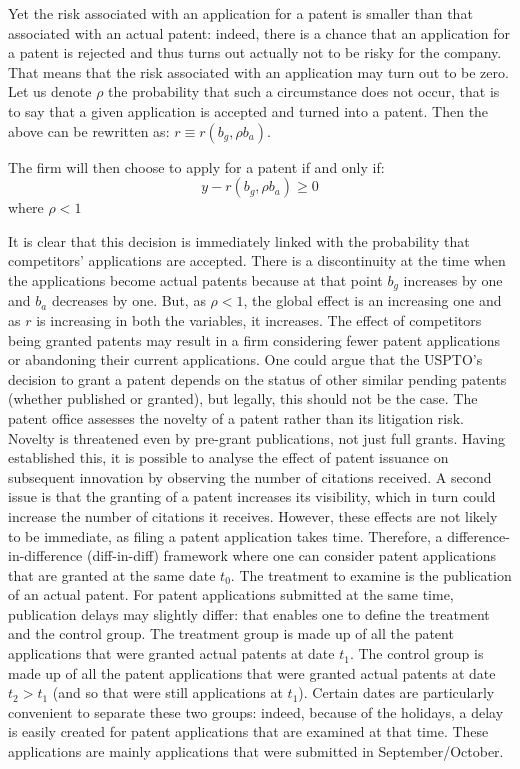 \documentclass[12pt]{article}
\begin{document}
Yet the risk associated with an application for a patent is smaller than that associated with an actual patent: indeed, there is a chance that an application for a patent is rejected and thus turns out actually not to be risky for the company. That means that the risk associated with an application may turn out to be zero. Let us denote $\rho$ the probability that such a circumstance does not occur, that is to say that a given application is accepted and turned into a patent. Then the above can be rewritten as: $r \equiv r(b_g,\rho b_a)$.

The firm will then choose to apply for a patent if and only if: 
\[
y - r(b_g,\rho b_a) \geq 0
\]
where $\rho < 1$

It is clear that this decision is immediately linked with the probability that competitors' applications are accepted. There is a discontinuity at the time when the applications become actual patents because at that point $b_g$ increases by one and $b_a$ decreases by one. But, as $\rho < 1$, the global effect is an increasing one and as $r$ is increasing in both the variables, it increases. 
The effect of competitors being granted patents may result in a firm considering fewer patent applications or abandoning their current applications. One could argue that the USPTO's decision to grant a patent depends on the status of other similar pending patents (whether published or granted), but legally, this should not be the case. The patent office assesses the novelty of a patent rather than its litigation risk. Novelty is threatened even by pre-grant publications, not just full grants.
Having established this, it is possible to analyse the effect of patent issuance on subsequent innovation by observing the number of citations received.
A second issue is that the granting of a patent increases its visibility, which in turn could increase the number of citations it receives. However, these effects are not likely to be immediate, as filing a patent application takes time.
Therefore, a difference-in-difference (diff-in-diff) framework where one can consider patent applications that are granted at the same date $t_0$. The treatment to examine is the publication of an actual patent. For patent applications submitted at the same time, publication delays may slightly differ: that enables one to define the treatment and the control group. The treatment group is made up of all the patent applications that were granted actual patents at date $t_1$. The control group is made up of all the patent applications that were granted actual patents at date $t_2 > t_1$ (and so that were still applications at $t_1$). Certain dates are particularly convenient to separate these two groups: indeed, because of the holidays, a delay is easily created for patent applications that are examined at that time. These applications are mainly applications that were submitted in September/October. 
\end{document}
